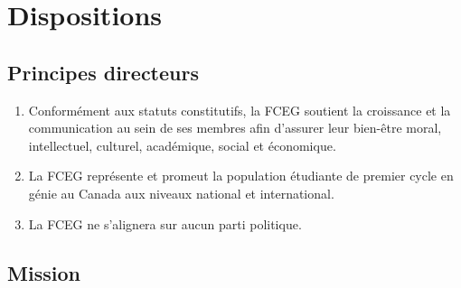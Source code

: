 \section{Dispositions}
\label{dispositions}

\subsection{Principes directeurs}
\label{dispositions-principes-directeurs}

\begin{enumerate}
 \item Conformément aux statuts constitutifs, la FCEG soutient la croissance et la communication au sein de ses membres afin d'assurer leur bien-être moral, intellectuel, culturel, académique, social et économique.
 \item La FCEG représente et promeut la population étudiante de premier cycle en génie au Canada aux niveaux national et international.
 \item La FCEG ne s'alignera sur aucun parti politique.
\end{enumerate}

\subsection{Mission}
\label{dispositions-mission}

